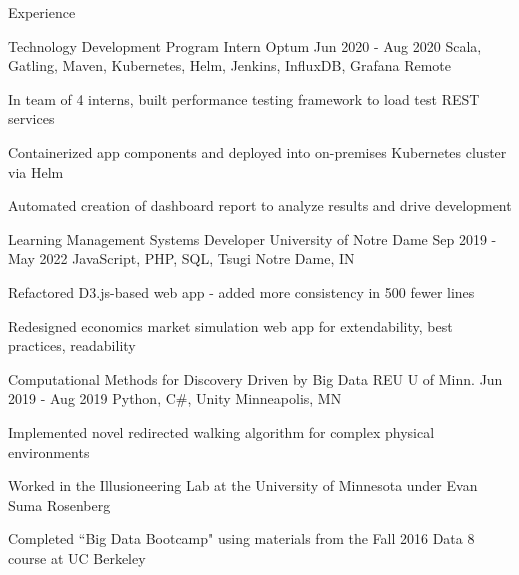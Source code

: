 \documentclass{resume} %
\begin{document}
\begin{rSection}{ Experience }
\begin{rSubsection}{ Technology Development Program Intern \at Optum }{ Jun 2020 - Aug 2020 }{ Scala, Gatling, Maven, Kubernetes, Helm, Jenkins, InfluxDB, Grafana }{ Remote }
\item In team of 4 interns, built performance testing framework to load test REST services
\item Containerized app components and deployed into on-premises Kubernetes cluster via Helm
\item Automated creation of dashboard report to analyze results and drive development
\end{rSubsection}

\begin{rSubsection}{ Learning Management Systems Developer \at University of Notre Dame }{ Sep 2019 - May 2022 }{ JavaScript, PHP, SQL, Tsugi }{ Notre Dame, IN }
\item Refactored D3.js-based web app - added more consistency in 500 fewer lines
\item Redesigned economics market simulation web app for extendability, best practices, readability
\end{rSubsection}

\begin{rSubsection}{ Computational Methods for Discovery Driven by Big Data REU \at U of Minn. }{ Jun 2019 - Aug 2019 }{ Python, C\#, Unity }{ Minneapolis, MN }
\item Implemented novel redirected walking algorithm for complex physical environments
\item Worked in the Illusioneering Lab at the University of Minnesota under Evan Suma Rosenberg
\item Completed ``Big Data Bootcamp" using materials from the Fall 2016 Data 8 course at UC Berkeley
\end{rSubsection}


\end{rSection}
\end{document}
